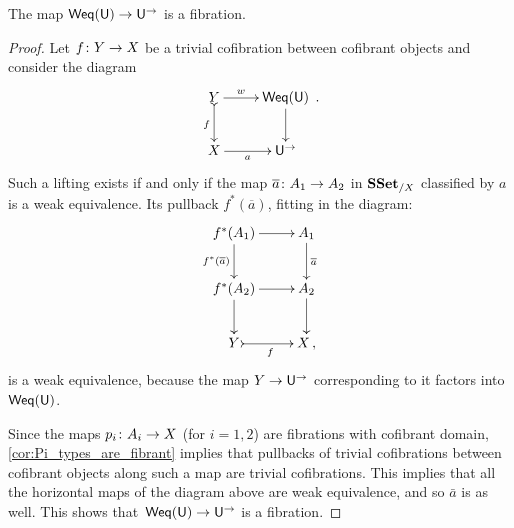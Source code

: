 \documentclass[reqno,10pt,a4paper,oneside,draft]{amsart}
\begin{document}






\begin{lemma} \label{thm:lemma-for-u} The map $\mathsf{Weq}(\mathsf{U}) \rightarrow \mathsf{U}^\to$ is a fibration.
\end{lemma}


\begin{proof}  Let $f \colon Y \to X$ be a trivial cofibration between cofibrant objects and consider the diagram
\[ 
\xymatrix{ 
Y \ar@{>->}[d]_f \ar[r]^-{w} & \mathsf{Weq}(\U) \ar[d] \\
X \ar[r]_-{a} & \U^{\rightarrow} } \, .
\]
Such a lifting exists if and only if the map $\overline{a} \colon A_1 \to A_2$ in $\mathbf{SSet}_{/X}$ classified by $a$ is a weak equivalence. Its pullback $f^*(\overline{a})$, fitting in the diagram:
\[ 
\xymatrix{ 
f^*(A_1) \ar[d]_{f^*(\overline{a})}  \ar[r]  & A_1 \ar[d]^{\overline{a}} \\
f^*(A_2) \ar[r] \ar[d]   & A_2 \ar[d] \\
Y \ar@{>->}[r]_f & X \, ,}
\]
is a weak equivalence, because the map $Y \rightarrow \mathsf{U}^{\to}$ corresponding to it factors into $\mathsf{Weq}(\mathsf{U})$.

Since the maps $p_i \colon A_i \rightarrow X$ (for $i = 1, 2$) are fibrations with cofibrant domain, \cref{cor:Pi_types_are_fibrant} implies that pullbacks of trivial cofibrations between cofibrant objects along such 
a map are trivial cofibrations. This implies that all the horizontal maps of the diagram above are weak equivalence, and so 
$\bar{a}$ is as well. This shows that~$\mathsf{Weq}(\mathsf{U}) \rightarrow \mathsf{U}^{\rightarrow}$ is a fibration.
\end{proof}
\end{document}
